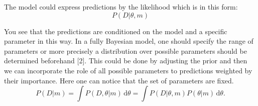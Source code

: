 The model could express predictions by the likelihood which is in this form:
\begin{equation}
P(D|\theta,m)
\end{equation}

You see that the predictions are conditioned on the model and a specific parameter in this way. 
In a fully Bayesian model, one should specify the range of parameters or more precisely 
a distribution over possible parameters should be determined beforehand [2]. 
This could be done by adjusting the prior and then we can incorporate the role of all possible parameters 
to predictions weighted by their importance. Here one can notice that the set of parameters are fixed.
\begin{equation}
P(D|m) = \int \! P(D,\theta|m) \, \mathrm{d}\theta = \int \!
P(D|\theta,m)P(\theta|m) \, \mathrm{d}\theta.
\end{equation} 

